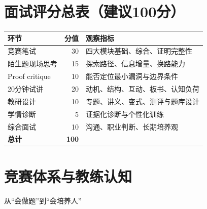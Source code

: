 \documentclass[11pt,openany]{ctexbook}
\begin{document}
\chapter*{面试评分总表（建议100分）}
\begin{tabularx}{\textwidth}{l r X}
\toprule
环节 & 分值 & 观察指标\\
\midrule
竞赛笔试 & 30 & 四大模块基础、综合、证明完整性\\
陌生题现场思考 & 15 & 探索路径、信息增量、换路能力\\
Proof critique & 10 & 能否定位最小漏洞与边界条件\\
20分钟试讲 & 20 & 动机、结构、互动、板书、认知负荷\\
教研设计 & 10 & 专题、讲义、变式、测评与题库设计\\
学情诊断 & 5 & 证据化诊断与个性化训练\\
综合面试 & 10 & 沟通、职业判断、长期培养观\\
\midrule
\textbf{总计} & \textbf{100} & \\
\bottomrule
\end{tabularx}

\tableofcontents
\mainmatter
\chapter{竞赛体系与教练认知}
\begin{center}\large\color{muted}从“会做题”到“会培养人”\end{center}
\vspace{1mm}
\clearpage
\end{document}
